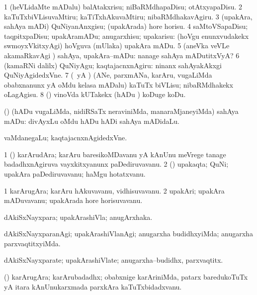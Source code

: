 \bentry
{}
\gl{\sakirx}
\bmng
% 
\bnum
\num{1} (heVLidaMte mADalu) balAtakxrisu; niBaRMdhapaDisu; otAtxyapaDisu. 
\num{2} kaTuTxbiVLisuvaMtiru; kaTiTxhAkuvaMtiru; nibaRMdhakavAgiru. 
\num{3} (upakAra, sahAya mADi) QuNiyanAnxgisu; (upakArada) hore horisu. 
\num{4} saMtoVSapaDisu; taqpitxpaDisu; upakAramADu; anugarxhisu; upakarisu:  (hoVgu enunxvudakekx swmoyxVkitxyAgi) hoVguva (mUlaka) upakAra mADu. 
\num{5} (aneVka veVLe akamaRkavAgi \parx) sahAya, upakAra--mADu:  nanage sahAya mADutitxVyA? 
\num{6} (kamaRNi \parx dalilx) QuNiyAgu; kaqtajacnxnAgiru:  ninanx sahAyakAkxgi QuNiyAgidedxVne. 
\num{7} (\pArxparx\ yA \nAyxshA) (ANe, parxmANa, karAru, \mo vugaLiMda obabxnanunx yA oMdu kelasa mADalu) kaTuTx biVLisu; nibaRMdhakekx oLagAgisu. 
\num{8} (\AmA) vinoVda kUTakekx (hADu \mo) koDuge koDu. 
\enum
\emng

\noindent
\gl{\akirx}
\bmng
(\AmA) (hADu \mo vugaLiMda, nidiRSaTx neraviniMda, manaraMjaneyiMda) sahAya mADu:  divAyxLu oMdu hADu hADi sahAya mADidaLu. 
\emng

\noindent
\gl{\pagu}
\bmng
{} 
 vaMdanegaLu; kaqtajacnxnAgidedxVne. 
\emng
\eentry

\bentry
{}
\gl{\nA}
\bmng
\bnum
\num{1} (\nAyxshA) karArudAra; karAru baresikoMDavanu yA kAnUnu meVrege tanage badadhxnAgiruva vayxkitxyanunx paDediruvavanu. 
\num{2} (\viparx) upakaqta; QuNi; upakAra paDediruvavanu; haMgu hotatxvanu. 
\enum
\emng
\eentry

\bentry
{}
\gl{\nA}
\bmng
\bnum
\num{1} karArugAra; karAru hAkuvavanu, vidhisuvavanu. 
\num{2} upakAri; upakAra mADuvavanu; upakArada hore horisuvavanu. 
\enum
\emng
\eentry

\bentry
{}
\gl{\gu}
\bmng
dAkiSxNayxpara; upakArashiVla; anugArxhaka. 
\emng
\eentry

\bentry
{}
\gl{\kirxvi}
\bmng
dAkiSxNayxparanAgi; upakArashiVlanAgi; anugarxha budidhxyiMda; anugarxha parxvaqtitxyiMda. 
\emng
\eentry

\bentry
{}
\gl{\nA}
\bmng
dAkiSxNayxparate; upakArashiVlate; anugarxha--budidhx, parxvaqtitx. 
\emng
\eentry

\bentry
{}
\gl{\nA}
\bmng
(\nAyxshA) karArugAra; karArubadadhx; obabxnige karAriniMda, patarx baredukoTuTx yA itara kAnUnukarxmada parxkAra kaTuTxbidadxvanu. 
\emng
\eentry


